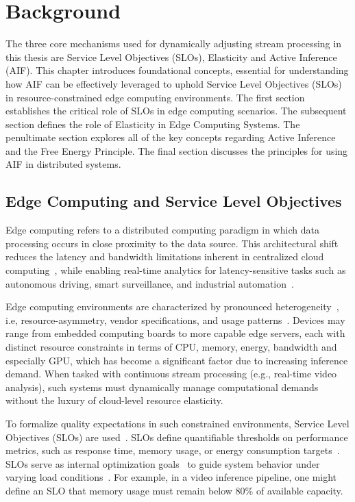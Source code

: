 \chapter{Background}

The three core mechanisms used for dynamically adjusting stream processing in this thesis are Service Level Objectives (SLOs), Elasticity and Active Inference (AIF). This chapter introduces foundational concepts, essential for understanding how AIF
can be effectively leveraged to uphold Service Level Objectives (SLOs) in resource-constrained
edge computing environments. The first section establishes the critical role of SLOs in edge computing scenarios. The subsequent section defines the role of Elasticity in Edge Computing Systems. The penultimate section explores all of the key concepts regarding Active Inference and the Free Energy Principle. The final section discusses the principles for using AIF in distributed systems.

\section{Edge Computing and Service Level Objectives}
Edge computing refers to a distributed computing paradigm in which data processing occurs in
close proximity to the data source. This architectural shift reduces the latency and bandwidth
limitations inherent in centralized cloud computing~\cite{deng_edge_2020}, while enabling real-time
analytics for latency-sensitive tasks such as autonomous driving, smart surveillance, and
industrial automation~\cite{zhang_octopus_2023}.

Edge computing environments are characterized by pronounced heterogeneity~\cite{furst_elastic_2018}, i.e, resource-asymmetry, vendor specifications, and usage patterns~\cite{danilenka_adaptive_2025}. Devices may range from embedded computing boards to more capable edge servers, each
with distinct resource constraints in terms of CPU, memory, energy, bandwidth and especially GPU, which has become a significant factor due to increasing inference demand. When tasked with continuous stream
processing (e.g., real-time video analysis), such systems must dynamically manage
computational demands without the luxury of cloud-level resource elasticity.

To formalize quality expectations in such constrained environments, Service Level Objectives
(SLOs) are used~\cite{casamayor_pujol_deepslos_2024}. SLOs define quantifiable thresholds on performance metrics, such as
response time, memory usage, or energy consumption targets~\cite{danilenka_adaptive_2025}. SLOs serve as internal optimization goals~\cite{danilenka_adaptive_2025} to guide system behavior under varying load conditions~\cite{nastic_sloc_2020}.
For example, in a video inference pipeline, one
might define an SLO that memory usage must remain below 80\% of available capacity.

